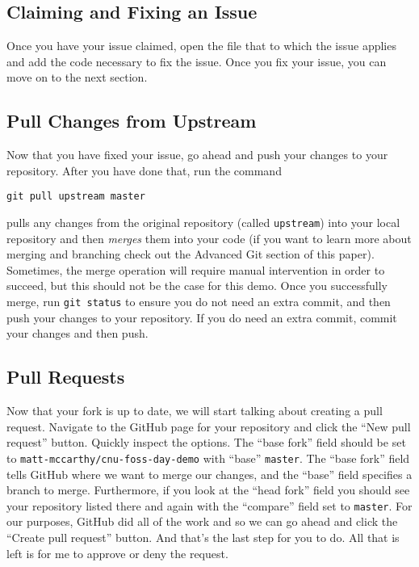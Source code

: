 \documentclass[notitlepage]{simple}
\begin{document}
\subsection{Claiming and Fixing an Issue}


Once you have your issue claimed, open the file that to which the issue applies and add the code necessary to fix the issue.
Once you fix your issue, you can move on to the next section.

\subsection{Pull Changes from Upstream}

Now that you have fixed your issue, go ahead and push your changes to your repository.
After you have done that, run the command
\begin{terminal}
	\verb|git pull upstream master|
\end{terminal}
pulls any changes from the original repository (called \verb|upstream|) into your local repository and then \textit{merges} them into your code
(if you want to learn more about merging and branching check out the Advanced Git section of this paper).
Sometimes, the merge operation will require manual intervention in order to succeed, but this should not be the case for this demo.
Once you successfully merge, run \verb|git status| to ensure you do not need an extra commit, and then push your changes to your repository.
If you do need an extra commit, commit your changes and then push.

\subsection{Pull Requests}

Now that your fork is up to date, we will start talking about creating a pull request.
Navigate to the GitHub page for your repository and click the ``New pull request'' button.
Quickly inspect the options.
The ``base fork'' field should be set to \verb|matt-mccarthy/cnu-foss-day-demo| with ``base'' \verb|master|.
The ``base fork'' field tells GitHub where we want to merge our changes, and the ``base'' field specifies a branch to merge.
Furthermore, if you look at the ``head fork'' field you should see your repository listed there and again with the ``compare'' field set to \verb|master|.
For our purposes, GitHub did all of the work and so we can go ahead and click the ``Create pull request'' button.
And that's the last step for you to do.
All that is left is for me to approve or deny the request.
\end{document}
